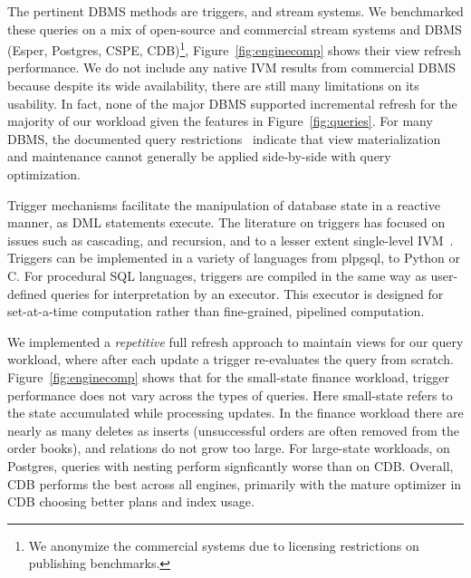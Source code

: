 The pertinent DBMS methods are triggers, and stream systems.
We benchmarked these queries on a mix of open-source and commercial stream
systems and DBMS (Esper, Postgres, CSPE, CDB)\footnote{We anonymize the
commercial systems due to licensing restrictions on publishing benchmarks.},
Figure~\ref{fig:enginecomp} shows their view refresh performance.
We do not include any native IVM results from commercial DBMS because despite
its wide availability, there are still many limitations on its usability.
In fact, none of the major DBMS supported incremental refresh for the
majority of our workload given the features in Figure~\ref{fig:queries}.
For many DBMS, the documented query
restrictions~\cite{db2-viewrestrict,mssql-viewrestrict,oracle-viewrestrict}
indicate that view materialization and maintenance cannot generally be applied
side-by-side with query optimization.

\vspace{1mm}
Trigger mechanisms facilitate the manipulation of database state in a reactive
manner, as DML statements execute.
The literature on triggers has focused on issues such as cascading, and
recursion, and to a lesser extent single-level IVM~\cite{baralis-rids95}.
Triggers can be implemented in a variety of languages from plpgsql, to Python or
C. For procedural SQL languages, triggers are compiled in the same way as
user-defined queries for interpretation by an executor.
This executor is designed for set-at-a-time computation rather than
fine-grained, pipelined computation. 

We implemented a \textit{repetitive} full refresh approach to maintain views for
our query workload, where after each update a trigger re-evaluates the query
from scratch.
Figure~\ref{fig:enginecomp} shows that for the small-state finance workload,
trigger performance does not vary across the types of queries. Here small-state
refers to the state accumulated while processing updates. In the finance
workload there are nearly as many deletes as inserts (unsuccessful orders are
often removed from the order books), and relations do not grow too large. For
large-state workloads, on Postgres, queries with nesting perform signficantly
worse than on CDB. Overall, CDB performs the best across all engines, primarily
with the mature optimizer in CDB choosing better plans and index usage.

